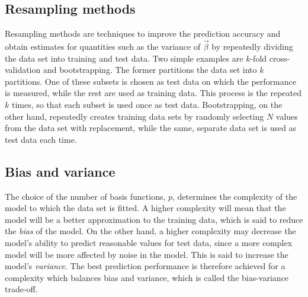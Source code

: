 \documentclass[11pt,british,a4paper]{article}
\numberwithin{equation}{section}
\begin{document}
\subsection{Resampling methods}
Resampling methods are techniques to improve the prediction accuracy and obtain estimates for quantities such as the variance of \(\vec{\beta}\) by repeatedly dividing the data set into training and test data.
Two simple examples are \(k\)-fold cross-validation and bootstrapping.
The former partitions the data set into \(k\) partitions.
One of these subsets is chosen as test data on which the performance is measured, while the rest are used as training data.
This process is the repeated \(k\) times, so that each subset is used once as test data.
Bootstrapping, on the other hand, repeatedly creates training data sets by randomly selecting \(N\) values from the data set with replacement, while the same, separate data set is used as test data each time.

\subsection{Bias and variance}
The choice of the number of basis functions, \(p\), determines the complexity of the model to which the data set is fitted.
A higher complexity will mean that the model will be a better approximation to the training data, which is said to reduce the \emph{bias} of the model.
On the other hand, a higher complexity may decrease the model's ability to predict reasonable values for test data, since a more complex model will be more affected by noise in the model.
This is said to increase the model's \emph{variance}.
The best prediction performance is therefore achieved for a complexity which balances bias and variance, which is called the bias-variance trade-off\cite{mehta}.
\end{document}
